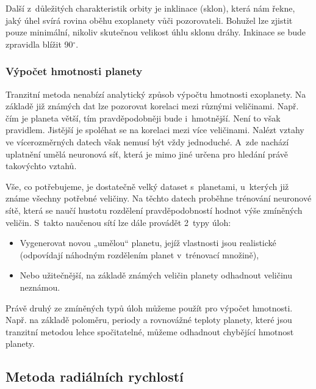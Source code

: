 \documentclass[a4paper,12pt]{article}
\begin{document}
{{Další z~důležitých charakteristik orbity je inklinace (sklon), která nám řekne, jaký úhel svírá rovina oběhu exoplanety vůči pozorovateli. Bohužel lze zjistit pouze minimální, nikoliv skutečnou velikost úhlu sklonu dráhy. Inkinace se bude zpravidla blížit 90$^{\circ}$.~\cite{transitprops}


\subsubsection{Výpočet hmotnosti planety}

Tranzitní metoda nenabízí analytický způsob výpočtu hmotnosti exoplanety. Na základě již známých dat lze pozorovat korelaci mezi různými veličinami. Např. čím je planeta větší, tím pravděpodobněji bude i~hmotnější. Není to však pravidlem. Jistější je spoléhat se na korelaci mezi více veličinami. Nalézt vztahy ve vícerozměrných datech však nemusí být vždy jednoduché. A~zde nachází uplatnění umělá neuronová síť, která je mimo jiné určena pro hledání právě takovýchto vztahů.~\cite{nnmass}

Vše, co potřebujeme, je dostatečně velký dataset s~planetami, u~kterých již známe všechny potřebné veličiny. Na těchto datech proběhne trénování neuronové sítě, která se naučí hustotu rozdělení pravděpodobností hodnot výše zmíněných veličin. S~takto naučenou sítí lze dále provádět 2~typy úloh:

\begin{itemize}
\item Vygenerovat novou „umělou“ planetu, jejíž vlastnosti jsou realistické (odpovídají náhodným rozdělením planet v~trénovací množině),

\item Nebo užitečnější, na základě známých veličin planety odhadnout veličinu neznámou.
\end{itemize}

Právě druhý ze zmíněných typů úloh můžeme použít pro výpočet hmotnosti. Např. na základě poloměru, periody a rovnovážné teploty planety, které jsou tranzitní metodou lehce spočitatelné, můžeme odhadnout chybějící hmotnost planety.~\cite{nnmass}

\clearpage
\subsection{Metoda radiálních rychlostí}

}}
\end{document}
